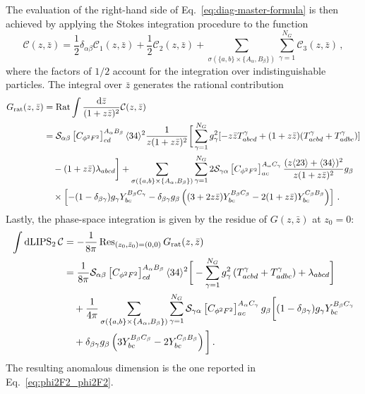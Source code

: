 The evaluation of the right-hand side of Eq.~\eqref{eq:diag-master-formula} is then achieved
by applying the Stokes integration procedure to the function
\begin{equation}
    \mathcal{C}(z,\bar z) = \frac{1}{2}\delta_{\alpha\beta} \mathcal{C}_1 (z,\bar z)
    + \frac{1}{2} \mathcal{C}_2 (z,\bar z)
    + \sum_{\sigma(\{a,b\}\times \{A_\alpha,B_\beta\})}\sum_{\gamma=1}^{N_G} \mathcal{C}_3 (z,\bar z)\,,
\end{equation}
where the factors of $1/2$ account for the integration over indistinguishable particles.
The integral over $\bar z$ generates the rational contribution
\begin{align}
    G_{\rm rat}(z,\bar z) &= \text{Rat} \int \frac{\text{d}\bar z}{(1+z\bar z)^2}\mathcal{C}(z,\bar z) \nonumber \\
    &= \mathcal S_{\alpha\beta} \left[C_{\phi^2F^2}\right]^{A_\alpha B_\beta}_{cd}\langle 3 4 \rangle^2
    \frac{1}{z(1+z\bar z)^2}\bigg[
    \sum_{\gamma=1}^{N_G} g_\gamma^2 [-z\bar z T^\gamma_{abcd}+(1+z\bar z ) (T^\gamma_{acbd}+T^\gamma_{adbc})]
    \nonumber \\ &\quad
    -(1+z\bar z)\lambda_{abcd}
    \bigg]
    +
    \sum_{\sigma(\{a,b\}\times \{A_\alpha,B_\beta\})}\sum_{\gamma=1}^{N_G}
    2 \mathcal S_{\gamma\alpha} \left[C_{\phi^2F^2}\right]^{A_\alpha C_\gamma}_{ac}
    \frac{(z\langle 2 3 \rangle+\langle 3 4 \rangle)^2}{z (1+z\bar z)^2 }g_\beta \nonumber \\
    &\quad \times \left[
    -(1-\delta_{\beta\gamma})g_\gamma Y^{B_\beta C_\gamma}_{bc} - \delta_{\beta\gamma}g_\beta
    \left(
    (3+2z\bar z)Y^{B_\beta C_\beta}_{bc}-2(1+z\bar z)Y^{C_\beta B_\beta}_{bc}
    \right)
    \right]\,.
\end{align}
Lastly, the phase-space integration is given by the residue of $G(z,\bar z)$ at $z_0=0$:
\begin{align}
\int \text{dLIPS}_2 \, \mathcal{C} &= -\frac{1}{8\pi} \Res_{(z_0,\bar z_0)=(0,0)} G_{\rm rat}(z,\bar z) \nonumber \\
&=
\frac{1}{8\pi} \mathcal S_{\alpha\beta} \left[C_{\phi^2F^2}\right]^{A_\alpha B_\beta}_{cd}\agl{3}{4}^2
\bigg[
- \sum_{\gamma=1}^{N_G} g_\gamma^2  \left(T^\gamma_{acbd}+T^\gamma_{adbc}\right)+\lambda_{abcd}
\bigg]\nonumber \\
&\quad +
\frac{1}{4\pi}
\sum_{\sigma(\{a,b\}\times \{A_\alpha,B_\beta\})}\sum_{\gamma=1}^{N_G}
\mathcal S_{\gamma\alpha} \left[C_{\phi^2F^2}\right]^{A_\alpha C_\gamma}_{ac}
   g_\beta
   \bigg[
   (1-\delta_{\beta\gamma})g_\gamma Y^{B_\beta C_\gamma}_{bc}
   \nonumber \\ &\quad +
    \delta_{\beta\gamma}g_\beta  \left(
    3 Y^{B_\beta C_\beta}_{bc}- 2Y^{C_\beta B_\beta}_{bc}
    \right)
   \bigg]\,.
\end{align}
The resulting anomalous dimension is the one reported in Eq.~\eqref{eq:phi2F2_phi2F2}.

